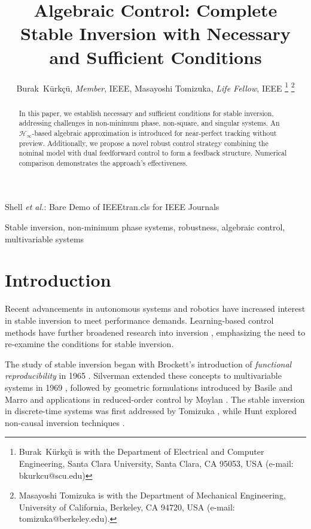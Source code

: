 \documentclass[journal]{IEEEtran}
\theoremstyle{remark}
\begin{document}
\title{Algebraic Control: Complete Stable Inversion with Necessary and Sufficient Conditions}

\author{Burak~K\"{u}rk\c{c}\"{u}, \textit{Member}, IEEE, Masayoshi Tomizuka, \textit{Life Fellow}, IEEE%
\thanks{Burak~K\"{u}rk\c{c}\"{u} is with the Department of Electrical and Computer Engineering,
        Santa Clara University, Santa Clara, CA 95053, USA
        (e-mail: bkurkcu@scu.edu)}%
\thanks{ Masayoshi Tomizuka is with the Department of
Mechanical Engineering, University of California, Berkeley,
CA 94720, USA (e-mail: tomizuka@berkeley.edu).}

}

\markboth{}%
{Shell \MakeLowercase{\textit{et al.}}: Bare Demo of IEEEtran.cls for IEEE Journals}

\maketitle

\begin{abstract}
In this paper, we establish necessary and sufficient conditions for stable inversion, addressing challenges in non-minimum phase, non-square, and singular systems. An $\mathcal{H}_\infty$-based algebraic approximation is introduced for near-perfect tracking without preview. Additionally, we propose a novel robust control strategy combining the nominal model with dual feedforward control to form a feedback structure. Numerical comparison demonstrates the approach's effectiveness.
\end{abstract}

\begin{IEEEkeywords}
Stable inversion, non-minimum phase systems, robustness, algebraic control, multivariable systems
\end{IEEEkeywords}

\IEEEpeerreviewmaketitle

\section{Introduction} Recent advancements in autonomous systems and robotics have increased interest in stable inversion to meet performance demands. Learning-based control methods have further broadened research into inversion \cite{de2022frequency}, emphasizing the need to re-examine the conditions for stable inversion.

The study of stable inversion began with Brockett's introduction of \textit{functional reproducibility} in 1965 \cite{brockett1965reproducibility}. Silverman extended these concepts to multivariable systems in 1969 \cite{silverman1969inversion}, followed by geometric formulations introduced by Basile and Marro \cite{basile1973new} and applications in reduced-order control by Moylan \cite{moylan1977stable}. The stable inversion in discrete-time systems was first addressed by Tomizuka \cite{tomizuka1987zero}, while Hunt explored non-causal inversion techniques \cite{hunt1996noncausal}. 
\end{document}
